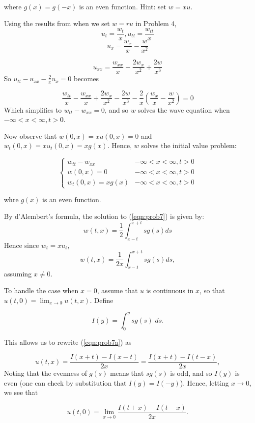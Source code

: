 \documentclass[
]{article}
\begin{document}
where \(g(x)=g(-x)\) is an even function. Hint: set \(w=xu\).

Using the results from when we set \(w=ru\) in Problem 4,
\[u_t=\frac{w_t}{x}, u_{tt}=\frac{w_{tt}}{x} \]
\[u_x= \frac{w_x}{x}- \frac{w}{x^2} \]

\[u_{xx}=  \frac{w_{xx}}{x}-\frac{2w_x}{x^2}+\frac{2w}{x^3}\] So
\(u_{tt}-u_{xx}- \frac{2}{x}u_x=0\) becomes

\[\frac{w_{tt}}{x} -\frac{w_{xx}}{x}+\frac{2w_x}{x^2}- \frac{2w}{x^3}- \frac{2}{x} \left(\frac{w_x}{x}- \frac{w}{x^2}\right)=0 \]
Which simplifies to \(w_{tt}-w_{xx}=0\), and so \(w\) solves the wave
equation when \(-\infty <x<\infty, t>0\).

Now observe that \(w(0,x)=xu(0,x)=0\) and \(w_t(0,x)=xu_t(0,x)=xg(x)\).
Hence, \(w\) solves the initial value problem:

\begin{equation} \label{eqn:prob7}
    \begin{cases}
      w_{tt}-w_{xx} & -\infty <x<\infty, t>0 \\
      w(0,x)=0 & -\infty <x<\infty, t>0 \\
      w_t(0,x) = xg(x) & -\infty <x<\infty, t>0
    \end{cases}       
\end{equation}

whre \(g(x)\) is an even function.

By d'Alembert's formula, the solution to (\ref{eqn:prob7}) is given by:
\[w(t,x)=\frac{1}{2} \int_{x-t}^{x+t}{sg(s)ds}\] Hence since
\(w_t=xu_t\), \begin{equation} \label{eqn:prob7a}
w(t,x)=\frac{1}{2x} \int_{x-t}^{x+t}{sg(s)ds,}
\end{equation} assuming \(x \neq 0\).

To handle the case when \(x=0\), assume that \(u\) is continuous in
\(x\), so that \(u(t,0)=\lim_{x\to 0} u(t,x)\). Define

\[I(y)=\int_{0}^{y}sg(s)\;ds. \]

This allows us to rewrite (\ref{eqn:prob7a}) as

\[u(t,x)=\frac{I(x+t)-I(x-t)}{2x}= \frac{I(x+t)-I(t-x)}{2x},\] Noting
that the evenness of \(g(s)\) means that \(sg(s)\) is odd, and so
\(I(y)\) is even (one can check by substitution that \(I(y)=I(-y)\)).
Hence, letting \(x \rightarrow 0\), we see that

\begin{equation}\label{eqn:prob7b}
u(t,0)= \lim_{x\to 0} \frac{I(t+x)-I(t-x)}{2x}.
\end{equation}
\end{document}
